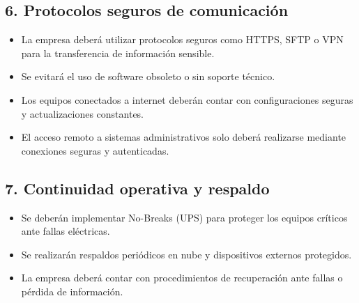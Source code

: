 \subsection*{6. Protocolos seguros de comunicación}
\begin{itemize}
    \item La empresa deberá utilizar protocolos seguros como HTTPS, SFTP o VPN para la transferencia de información sensible.
    \item Se evitará el uso de software obsoleto o sin soporte técnico.
    \item Los equipos conectados a internet deberán contar con configuraciones seguras y actualizaciones constantes.
    \item El acceso remoto a sistemas administrativos solo deberá realizarse mediante conexiones seguras y autenticadas.
\end{itemize}

\subsection*{7. Continuidad operativa y respaldo}
\begin{itemize}
    \item Se deberán implementar No-Breaks (UPS) para proteger los equipos críticos ante fallas eléctricas.
    \item Se realizarán respaldos periódicos en nube y dispositivos externos protegidos.
    \item La empresa deberá contar con procedimientos de recuperación ante fallas o pérdida de información.
\end{itemize}
